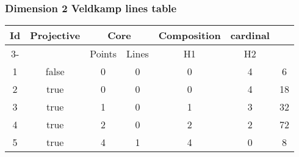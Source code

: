 
\begin{frame}
	\frametitle{Dimension 2 Veldkamp lines table}
	\noindent\centering
	\begin{tabular}{|c|c|c|c|c|c|c|}
		\hline
		\multirow{2}{*}{Id} & \multirow{2}{*}{Projective} & \multicolumn{2}{c|}{Core} & \multicolumn{\pointsTypeNumber}{c|}{Composition} & \multirow{2}{*}{cardinal}\\
		\cline{3-\clineEnd}
		 & & Points & Lines & H1 & H2 & \\
		\hline
		\hline
		1 & false & 0 & 0 &  0 &  4 & 6\\
		\hline
		2 & true & 0 & 0 &  0 &  4 & 18\\
		\hline
		3 & true & 1 & 0 &  1 &  3 & 32\\
		\hline
		4 & true & 2 & 0 &  2 &  2 & 72\\
		\hline
		5 & true & 4 & 1 &  4 &  0 & 8\\
		\hline
	\end{tabular}
\end{frame}
